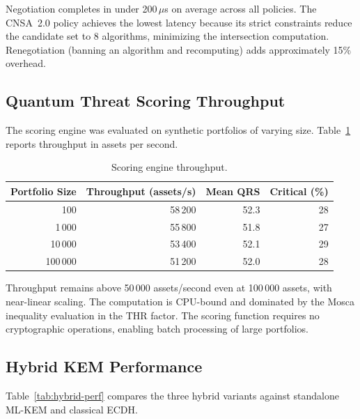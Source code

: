 \documentclass[conference,10pt]{IEEEtran}
\begin{document}
Negotiation completes in under 200\,$\mu$s on average across all
policies. The CNSA~2.0 policy achieves the lowest latency because its
strict constraints reduce the candidate set to 8 algorithms, minimizing
the intersection computation. Renegotiation (banning an algorithm and
recomputing) adds approximately 15\% overhead.

\subsection{Quantum Threat Scoring Throughput}

The scoring engine was evaluated on synthetic portfolios of varying size.
Table~\ref{tab:scoring-throughput} reports throughput in assets per
second.

\begin{table}[t]
\centering
\caption{Scoring engine throughput.}
\label{tab:scoring-throughput}
\footnotesize
\begin{tabular}{@{}rrrr@{}}
\toprule
\textbf{Portfolio Size} & \textbf{Throughput (assets/s)} & \textbf{Mean QRS} & \textbf{Critical (\%)} \\
\midrule
100       & 58\,200  & 52.3 & 28 \\
1\,000    & 55\,800  & 51.8 & 27 \\
10\,000   & 53\,400  & 52.1 & 29 \\
100\,000  & 51\,200  & 52.0 & 28 \\
\bottomrule
\end{tabular}
\end{table}

Throughput remains above 50\,000 assets/second even at 100\,000 assets,
with near-linear scaling. The computation is CPU-bound and dominated by
the Mosca inequality evaluation in the THR factor. The scoring function
requires no cryptographic operations, enabling batch processing of
large portfolios.

\subsection{Hybrid KEM Performance}

Table~\ref{tab:hybrid-perf} compares the three hybrid variants against
standalone ML-KEM and classical ECDH.
\end{document}
